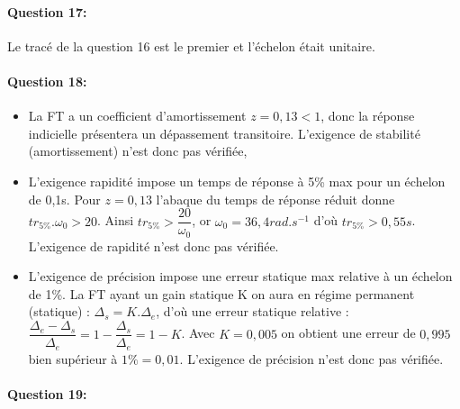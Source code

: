 \paragraph{Question 17:}

Le tracé de la question 16 est le premier et l'échelon était unitaire.

\paragraph{Question 18:}

\begin{itemize}
 \item La FT a un coefficient d'amortissement $z=0,13<1$, donc la réponse indicielle présentera un dépassement transitoire. L'exigence de stabilité (amortissement) n'est donc pas vérifiée,
 \item L'exigence rapidité impose un temps de réponse à 5\% max pour un échelon de 0,1s. Pour $z=0,13$ l'abaque du temps de réponse réduit donne $tr_{5\%}.\omega_0>20$. Ainsi $tr_{5\%}>\dfrac{20}{\omega_0}$, or $\omega_0=36,4rad.s^{-1}$ d'où $tr_{5\%}>0,55s$. L'exigence de rapidité n'est donc pas vérifiée.
 \item L'exigence de précision impose une erreur statique max relative à un échelon de 1\%. La FT ayant un gain statique K on aura en régime permanent (statique) : $\Delta_s=K.\Delta_e$, d'où une erreur statique relative : $\dfrac{\Delta_e-\Delta_s}{\Delta_e}=1-\dfrac{\Delta_s}{\Delta_e}=1-K$.	
Avec $K=0,005$ on obtient une erreur de $0,995$ bien supérieur à $1\%=0,01$. L'exigence de précision n'est donc pas vérifiée.
\end{itemize}

\paragraph{Question 19:} ~\ \\ \newpage






